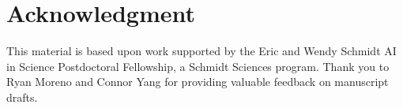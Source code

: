 \section*{Acknowledgment}

This material is based upon work supported by the Eric and Wendy Schmidt AI in Science Postdoctoral Fellowship, a Schmidt Sciences program.
Thank you to Ryan Moreno and Connor Yang for providing valuable feedback on manuscript drafts.

